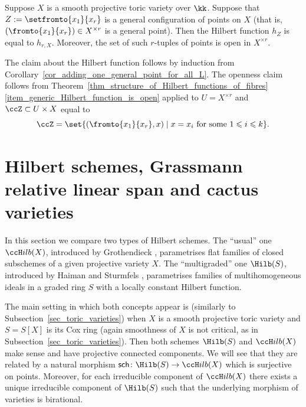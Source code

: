 \documentclass[12pt,a4paper]{article}
\newcommand{\usualHilb}{{\ccH}ilb}
\DeclareMathOperator{\sch}{\mathsf {sch}}
\begin{document}
\begin{thm}\label{thm_Sip_open}
  Suppose
    $X$ is a smooth projective toric variety over $\kk$.
    Suppose that $Z:=\setfromto{x_1}{x_r}$ is a general configuration of points on $X$ (that is, $(\fromto{x_1}{x_r}) \in X^{\times r}$ is a general point).
    Then the Hilbert function $h_Z$ is equal to $h_{r, X}$.
  Moreover, the set of such $r$-tuples of points
     is open in $X^{\times r}$.
\end{thm}


\begin{prf}
   The claim about the Hilbert function follows by induction from Corollary~\ref{cor_adding_one_general_point_for_all_L}.
   The openness claim follows from Theorem~\ref{thm_structure_of_Hilbert_functions_of_fibres}\ref{item_generic_Hilbert_function_is_open} applied to $U=X^{\times r}$ and $\ccZ\subset U \times X$ equal to
   \[
      \ccZ = \set{(\fromto{x_1}{x_r} , x) \mid x=x_i\text{ for some } 1\leqslant i \leqslant k}.
   \]
\end{prf}


\section{Hilbert schemes, Grassmann relative linear span and cactus varieties}
\label{sec_cactus_variety}

In this section we compare two types of Hilbert schemes.
The ``usual'' one $\usualHilb(X)$, introduced by Grothendieck \cite{grothendieck_techn_de_constr_et_exist_GA_IV_Hilb}, parametrises flat families of closed subschemes of a given projective variety $X$.
The ``multigraded'' one $\Hilb(S)$, introduced by Haiman and Sturmfels \cite{haiman_sturmfels_multigraded_Hilb}, parametrises families of multihomogeneous ideals in a graded ring $S$ with a locally constant Hilbert function.

The main setting in which both concepts appear is (similarly to Subsection~\ref{sec_toric_varieties}) when $X$ is a smooth projective toric variety and $S=S[X]$ is its Cox ring (again smoothness of $X$ is not critical, as in Subsection~\ref{sec_toric_varieties}).
Then both schemes $\Hilb(S)$ and $\usualHilb(X)$ make sense and have projective connected components.
We will see that they are related by a natural morphism $\sch\colon \Hilb(S) \to \usualHilb(X)$ which is surjective on points.
Moreover, for each irreducible component of $\usualHilb(X)$ there exists a unique irreducible component of $\Hilb(S)$ such that the underlying morphism of varieties is birational.
\end{document}
